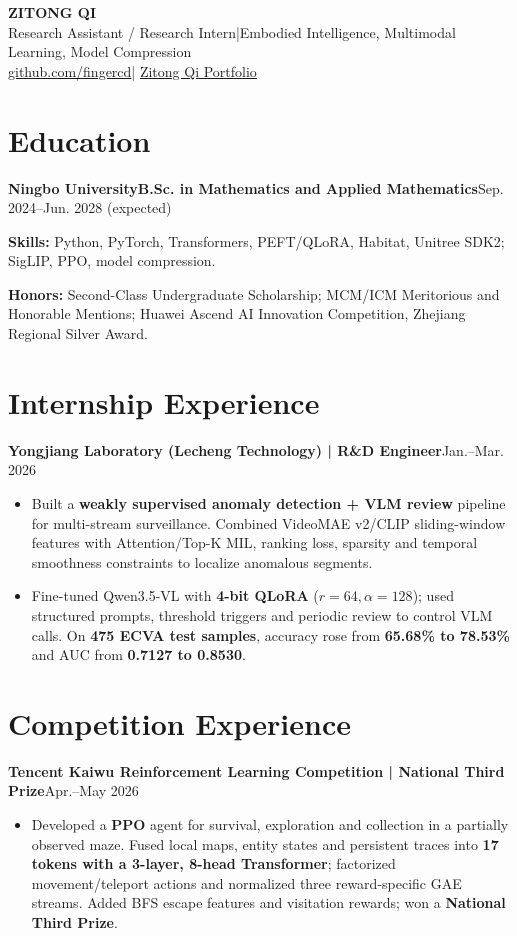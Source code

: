 \documentclass[11pt,a4paper]{article}
\newcommand{\entry}[2]{\par\noindent\textbf{#1}\hfill #2\par}
\begin{document}
\fontsize{10.5}{12.7}\selectfont

\begin{center}
{\fontsize{25}{28}\selectfont\textbf{ZITONG QI}}\\[4pt]
Research Assistant / Research Intern\quad |\quad Embodied Intelligence, Multimodal Learning, Model Compression\\[2pt]
\href{https://github.com/fingercd}{github.com/fingercd}\quad |\quad
\href{https://fingercd.github.io/en/}{Zitong Qi Portfolio}
\end{center}

\section{Education}
\entry{Ningbo University\quad B.Sc. in Mathematics and Applied Mathematics}{Sep. 2024--Jun. 2028 (expected)}
\textbf{Skills:} Python, PyTorch, Transformers, PEFT/QLoRA, Habitat, Unitree SDK2; SigLIP, PPO, model compression.\par
\textbf{Honors:} Second-Class Undergraduate Scholarship; MCM/ICM Meritorious and Honorable Mentions; Huawei Ascend AI Innovation Competition, Zhejiang Regional Silver Award.

\section{Internship Experience}
\entry{Yongjiang Laboratory (Lecheng Technology) | R\&D Engineer}{Jan.--Mar. 2026}
\begin{itemize}
\item Built a \textbf{weakly supervised anomaly detection + VLM review} pipeline for multi-stream surveillance. Combined VideoMAE v2/CLIP sliding-window features with Attention/Top-K MIL, ranking loss, sparsity and temporal smoothness constraints to localize anomalous segments.
\item Fine-tuned Qwen3.5-VL with \textbf{4-bit QLoRA} ($r=64,\alpha=128$); used structured prompts, threshold triggers and periodic review to control VLM calls. On \textbf{475 ECVA test samples}, accuracy rose from \textbf{65.68\% to 78.53\%} and AUC from \textbf{0.7127 to 0.8530}.
\end{itemize}

\section{Competition Experience}
\entry{Tencent Kaiwu Reinforcement Learning Competition | National Third Prize}{Apr.--May 2026}
\begin{itemize}
\item Developed a \textbf{PPO} agent for survival, exploration and collection in a partially observed maze. Fused local maps, entity states and persistent traces into \textbf{17 tokens with a 3-layer, 8-head Transformer}; factorized movement/teleport actions and normalized three reward-specific GAE streams. Added BFS escape features and visitation rewards; won a \textbf{National Third Prize}.
\end{itemize}
\end{document}
